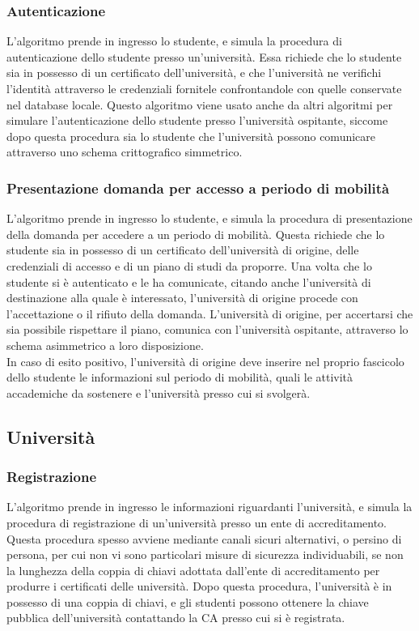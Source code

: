 \documentclass[a4paper,12pt]{article}
\begin{document}
\subsubsection{Autenticazione}
L'algoritmo prende in ingresso lo studente, e simula la procedura di autenticazione dello studente presso un'università. Essa richiede che lo studente sia in possesso di un certificato dell'università, e che l'università ne verifichi l'identità attraverso le credenziali fornitele confrontandole con quelle conservate nel database locale. Questo algoritmo viene usato anche da altri algoritmi per simulare l'autenticazione dello studente presso l'università ospitante, siccome dopo questa procedura sia lo studente che l'università possono comunicare attraverso uno schema crittografico simmetrico.
\subsubsection{Presentazione domanda per accesso a periodo di mobilità}
L'algoritmo prende in ingresso lo studente, e simula la procedura di presentazione della domanda per accedere a un periodo di mobilità. Questa richiede che lo studente sia in possesso di un certificato dell'università di origine, delle credenziali di accesso e di un piano di studi da proporre. Una volta che lo studente si è autenticato e le ha comunicate, citando anche l'università di destinazione alla quale è interessato, l'università di origine procede con l'accettazione o il rifiuto della domanda. L'università di origine, per accertarsi che sia possibile rispettare il piano, comunica con l'università ospitante, attraverso lo schema asimmetrico a loro disposizione. 
\\[1em]
In caso di esito positivo, l'università di origine deve inserire nel proprio fascicolo dello studente le informazioni sul periodo di mobilità, quali le attività accademiche da sostenere e l'università presso cui si svolgerà.
\subsection{Università}
\subsubsection{Registrazione}
L'algoritmo prende in ingresso le informazioni riguardanti l'università, e simula la procedura di registrazione di un'università presso un ente di accreditamento. Questa procedura spesso avviene mediante canali sicuri alternativi, o persino di persona, per cui non vi sono particolari misure di sicurezza individuabili, se non la lunghezza della coppia di chiavi adottata dall'ente di accreditamento per produrre i certificati delle università. Dopo questa procedura, l'università è in possesso di una coppia di chiavi, e gli studenti possono ottenere la chiave pubblica dell'università contattando la CA presso cui si è registrata.
\end{document}
